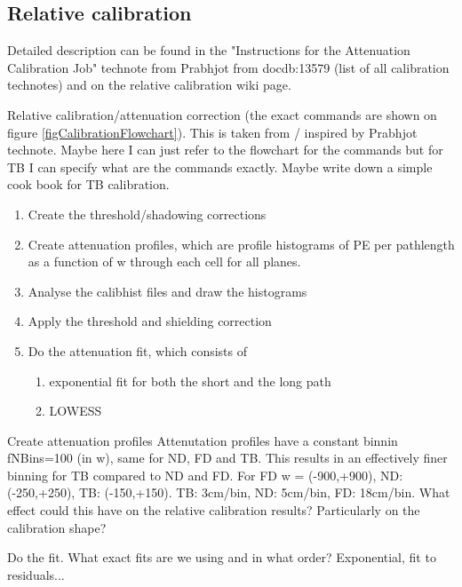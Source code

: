 \documentclass[12pt,a4paper]{article}
\begin{document}
\subsection{Relative calibration}

Detailed description can be found in the "Instructions for the Attenuation Calibration Job" technote from Prabhjot from docdb:13579 (list of all calibration technotes) and on the relative calibration wiki page.

Relative calibration/attenuation correction (the exact commands are shown on figure \ref{figCalibrationFlowchart}). This is taken from / inspired by Prabhjot technote. Maybe here I can just refer to the flowchart for the commands but for TB I can specify what are the commands exactly. Maybe write down a simple cook book for TB calibration.
\begin{enumerate}
\item Create the threshold/shadowing corrections
\item Create attenuation profiles, which are profile histograms of PE per pathlength as a function of w through each cell for all planes.
\item Analyse the calibhist files and draw the histograms
\item Apply the threshold and shielding correction
\item Do the attenuation fit, which consists of
\begin{enumerate}
\item exponential fit for both the short and the long path
\item LOWESS
\end{enumerate}
\end{enumerate}

Create attenuation profiles
Attenutation profiles have a constant binnin fNBins=100 (in w), same for ND, FD and TB. This results in an effectively finer binning for TB compared to ND and FD. For FD w = (-900,+900), ND: (-250,+250), TB: (-150,+150).
TB: 3cm/bin, ND: 5cm/bin, FD: 18cm/bin.
What effect could this have on the relative calibration results? Particularly on the calibration shape?

Do the fit. What exact fits are we using and in what order? Exponential, fit to residuals...
\end{document}
